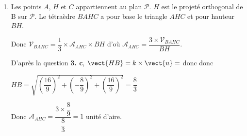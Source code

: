 \begin{enumerate}
\begin{enumerate}
Donc en posant $H(x~;~y~;~z)$ et $B(-1~;~3~;~0)$ alors .

De plus $\vect{HB}=k\times \vect{u}=-\dfrac{8}{9}\times \vect{u}$ donc 	$\left\{\begin{array}{l c l}- 1 - x&=&-\dfrac{8}{9}\times 2\\3 - y &=& -\dfrac{8}{9}\times (- 1)\\-z&=&-\dfrac{8}{9}\times 2 \end{array}\right.$

Donc $x=\dfrac{16}{9}-1=\dfrac{7}{9}$ , $y=3-\dfrac{8}{9}=\dfrac{19}{9}$ et $z=\dfrac{16}{9}$. On retrouve les coordonnées du point $H$.
\end{enumerate}
		\item Les points $A$, $H$ et $C$ appartiennent au plan $\mathcal{P}$. $H$ est le projeté orthogonal de B sur  $\mathcal{P}$. Le tétraèdre $BAHC$ a pour base le triangle $AHC$ et pour hauteur $BH$.

Donc $\mathcal{V}_{BAHC}=\dfrac{1}{3}\times \mathcal{A}_{AHC}\times BH$ d'où $\mathcal{A}_{AHC}=\dfrac{3\times \mathcal{V}_{BAHC}}{BH}$.

D'après la question \textbf{3. c}, $\vect{HB}=k\times \vect{u}=$ donc  donc

$HB=\sqrt{\left(\dfrac{16}{9}\right)^2+\left(-\dfrac{8}{9}\right)^2+\left(\dfrac{16}{9}\right)^2} = \dfrac{8}{3}$

Donc  $\mathcal{A}_{AHC}=\dfrac{3\times \dfrac{8}{9}}{\dfrac{8}{3}}=1$ unité d'aire.
\end{enumerate}

\bigskip

